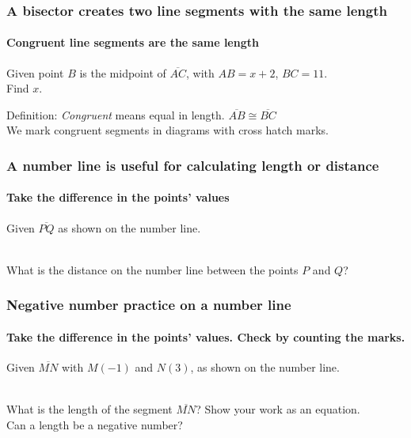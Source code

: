 \documentclass{beamer}
\begin{document}
\frame
{
  \frametitle{A bisector creates two line segments with the same length}
  \framesubtitle{Congruent line segments are the same length}
  Given point $B$ is the midpoint of $\overline{AC}$, with $AB=x+2$, $BC=11$. \\
  Find $x$.
    \begin{center}
    \end{center} \vspace{2cm}
    Definition:  \emph{Congruent} means equal in length. $\overline{AB} \cong \overline{BC}$\\
    We mark congruent segments in diagrams with cross hatch marks.
}

\frame
{
  \frametitle{A number line is useful for calculating length or distance}
  \framesubtitle{Take the difference in the points' values}
  Given $\overline{PQ}$ as shown on the number line. \\[20pt] %
     \\ \bigskip
What is the distance on the number line between the points $P$ and $Q$? \vspace{2cm}  
}

\frame
{
  \frametitle{Negative number practice on a number line}
  \framesubtitle{Take the difference in the points' values. Check by counting the marks.}
  Given $\overline{MN}$ with $M(-1)$ and $N(3)$, as shown on the number line. \\[0.25cm]
     \\ \bigskip
What is the length of the segment $\overline{MN}$? Show your work as an equation.\\[1.5cm]
Can a length be a negative number? \vspace{2cm}  
}
\end{document}
